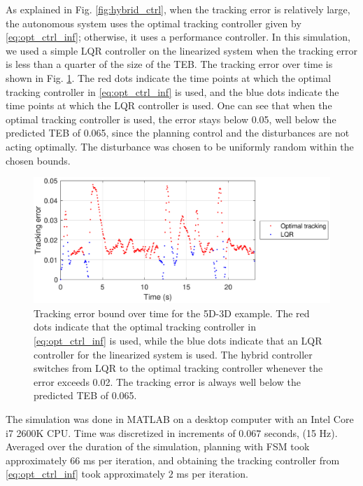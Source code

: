 As explained in Fig. \ref{fig:hybrid_ctrl}, when the tracking error is relatively large, the autonomous system uses the optimal tracking controller given by \eqref{eq:opt_ctrl_inf}; otherwise, it uses a performance controller. 
In this simulation, we used a simple LQR controller on the linearized system when the tracking error is less than a quarter of the size of the TEB.
The tracking error over time is shown in Fig. \ref{fig:P5D_Dubins_tracking_error}.
The red dots indicate the time points at which the optimal tracking controller in \eqref{eq:opt_ctrl_inf} is used, and the blue dots indicate the time points at which the LQR controller is used. 
One can see that when the optimal tracking controller is used, the error stays below 0.05, well below the predicted TEB of 0.065, since the planning control and the disturbances are not acting optimally.
The disturbance was chosen to be uniformly random within the chosen bounds.

\begin{figure}
  \includegraphics[width=\columnwidth]{fig/P5D_Dubins/tracking_error}
  \caption{Tracking error bound over time for the 5D-3D example. The red dots indicate that the optimal tracking controller in \eqref{eq:opt_ctrl_inf} is used, while the blue dots indicate that an LQR controller for the linearized system is used. The hybrid controller switches from LQR to the optimal tracking controller whenever the error exceeds 0.02. The tracking error is always well below the predicted TEB of 0.065.}
  \label{fig:P5D_Dubins_tracking_error}
\end{figure}

The simulation was done in MATLAB on a desktop computer with an Intel Core i7 2600K CPU.
Time was discretized in increments of $0.067$ seconds, (15 Hz).
Averaged over the duration of the simulation, planning with FSM took approximately $66$ ms per iteration, and obtaining the tracking controller from \eqref{eq:opt_ctrl_inf} took approximately $2$ ms per iteration.

